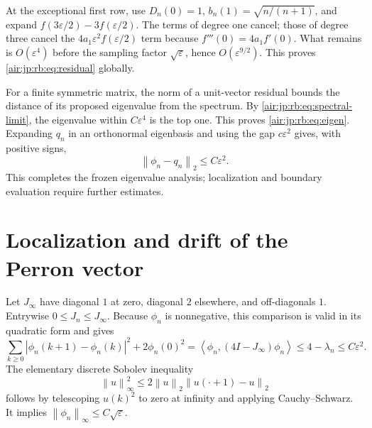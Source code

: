 \documentclass[11pt,letterpaper]{article}
\numberwithin{equation}{section}
\theoremstyle{remark}
\newcommand{\norm}[1]{\left\lVert#1\right\rVert}
\newcommand{\ip}[2]{\left\langle#1,#2\right\rangle}
\newcommand{\eps}{\varepsilon}
\begin{document}
At the exceptional first row, use $D_n(0)=1$, $b_n(1)=\sqrt{n/(n+1)}$, and expand $f(3\eps/2)-3f(\eps/2)$. The terms of degree one cancel; those of degree three cancel the $4a_1\eps^2f(\eps/2)$ term because $f'''(0)=4a_1f'(0)$. What remains is $O(\eps^4)$ before the sampling factor $\sqrt\eps$, hence $O(\eps^{9/2})$. This proves \eqref{air:jp:rb:eq:residual} globally.

For a finite symmetric matrix, the norm of a unit-vector residual bounds the distance of its proposed eigenvalue from the spectrum. By \eqref{air:jp:rb:eq:spectral-limit}, the eigenvalue within $C\eps^4$ is the top one. This proves \eqref{air:jp:rb:eq:eigen}. Expanding $q_n$ in an orthonormal eigenbasis and using the gap $c\eps^2$ gives, with positive signs,
\begin{equation}\label{air:jp:rb:eq:profile}
 \norm{\phi_n-q_n}_2\le C\eps^2.
\end{equation}
This completes the frozen eigenvalue analysis; localization and boundary evaluation require further estimates.

\section{Localization and drift of the Perron vector}\label{air:jp:rb:sec:localization}

Let $J_\infty$ have diagonal $1$ at zero, diagonal $2$ elsewhere, and off-diagonals $1$. Entrywise $0\le J_n\le J_\infty$. Because $\phi_n$ is nonnegative, this comparison is valid in its quadratic form and gives
\begin{equation}\label{air:jp:rb:eq:gradient}
 \sum_{k\ge0}|\phi_n(k+1)-\phi_n(k)|^2+2\phi_n(0)^2
 =\ip{\phi_n}{(4I-J_\infty)\phi_n}
 \le4-\lambda_n\le C\eps^2.
\end{equation}
The elementary discrete Sobolev inequality
\[
 \norm u_\infty^2\le2\norm u_2\norm{u(\cdot+1)-u}_2
\]
follows by telescoping $u(k)^2$ to zero at infinity and applying Cauchy--Schwarz. It implies $\norm{\phi_n}_\infty\le C\sqrt\eps$.
\end{document}
